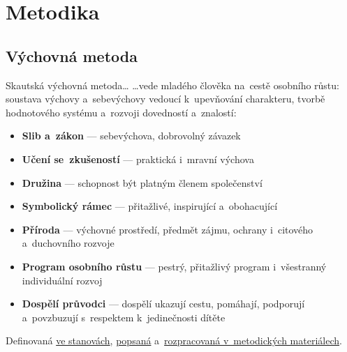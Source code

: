 \documentclass[compress, ucs, xelatex, 11pt, xcolor=dvipsnames, print,
	hyperref={
		bookmarks=true,
		unicode=true,
		colorlinks=true,
		pdftitle={Skautska vychovna metoda},
		plainpages=false,
		pdfauthor={Vojtech Zeisek},
		pdfsubject={Skautska vychovna metoda a jeji vyvoj za posledni stoleti a desetileti},
		pdfcreator={XeLaTeX},
		pdfkeywords={Junak, Pedagogika, Skaut, Skauting, Vychovna metoda},
		linkcolor=Black,
		anchorcolor=Black,
		citecolor=OliveGreen,
		filecolor=OliveGreen,
		menucolor=Black,
		urlcolor=OliveGreen,
		pdftex},
	url={hyphens, lowtilde} %
	]{beamer}
\begin{document}
\section{Metodika}

\subsection{Výchovná metoda}

\begin{frame}{Skautská výchovná metoda\ldots}
	\ldots vede mladého člověka na~cestě osobního růstu: soustava výchovy a~sebevýchovy vedoucí k~upevňování charakteru, tvorbě hodnotového systému a~rozvoji dovedností a~znalostí:
	\begin{itemize}
		\item \textbf{Slib a~zákon} --- sebevýchova, dobrovolný závazek
		\item \textbf{Učení se~zkušeností} --- praktická i~mravní výchova
		\item \textbf{Družina} --- schopnost být platným členem společenství
		\item \textbf{Symbolický rámec} --- přitažlivé, inspirující a~obohacující
		\item \textbf{Příroda} --- výchovné prostředí, předmět zájmu, ochrany i~citového a~duchovního rozvoje
		\item \textbf{Program osobního růstu} --- pestrý, přitažlivý program i~všestranný individuální rozvoj
		\item \textbf{Dospělí průvodci} --- dospělí ukazují cestu, pomáhají, podporují a~povzbuzují s~respektem k~jedinečnosti dítěte
	\end{itemize}
	Definovaná \href{https://krizovatka.skaut.cz/stredisko/administrativa/novy-obcansky-zakonik-stanovy/nove-stanovy}{ve stanovách}, \href{https://krizovatka.skaut.cz/oddil/program/3360-skautska-vychovna-metoda}{popsaná} a~\href{https://krizovatka.skaut.cz/oddil/program/}{rozpracovaná v~metodických materiálech}.
\end{frame}
\end{document}
